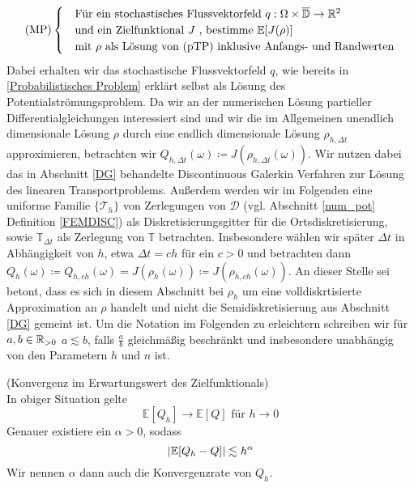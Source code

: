 \begin{align}
\text{(MP)}
\begin{cases}
\label{Modellproblem}
&\text{Für ein stochastisches Flussvektorfeld } q: \Omega \times \overline{\mathbb{D}} \to \mathbb{R}^2 \\
&\text{und ein Zielfunktional } J \text{ , bestimme }  \mathbb{E}[J(\rho)]  \\
&\text{mit } \rho \text{ als Lösung von (pTP) inklusive Anfangs- und Randwerten}
\end{cases}
\end{align} 
Dabei erhalten wir das stochastische Flussvektorfeld $ q $, wie bereits in \ref{Probabilistisches Problem} erklärt selbst als Lösung des Potentialströmungsproblem.
Da wir an der numerischen Lösung partieller Differentialgleichungen interessiert sind und wir die im Allgemeinen unendlich dimensionale Lösung $ \rho $ durch eine endlich dimensionale Lösung $ \rho_{h,\Delta t} $ approximieren, betrachten wir $ Q_{h,\Delta t}(\omega) \coloneqq J(\rho_{h,\Delta t}(\omega )) $.
Wir nutzen dabei das in Abschnitt \ref{DG} behandelte Discontinuous Galerkin Verfahren zur Lösung des linearen Transportproblems. Außerdem werden wir im Folgenden eine uniforme Familie $ \{ \mathcal{T}_h \} $ von Zerlegungen von $ \mathcal{D} $ (vgl. Abschnitt \ref{num_pot} Definition \ref{FEMDISC}) als Diskretisierungsgitter für die Ortsdiskretisierung, sowie $ \mathbb{T}_{\Delta t} $ als Zerlegung von $ \mathbb{T} $ betrachten.
Insbesondere wählen wir später $ \Delta t $ in Abhängigkeit von $ h $, etwa $ \Delta t = c  h $ für ein $ c>0 $ und betrachten dann
$ Q_h(\omega) \coloneqq Q_{h,ch}(\omega) = J(\rho_h(\omega )) \coloneqq J(\rho_{h,ch}(\omega )) $.
An dieser Stelle sei betont, dass es sich in diesem Abschnitt bei $ \rho_h $ um eine volldiskrtisierte Approximation an $ \rho $ handelt und nicht die Semidiskretisierung aus Abschnitt \ref{DG} gemeint ist. Um die Notation im Folgenden zu erleichtern schreiben wir für $ a,b \in \mathbb{R}_{> 0} $ $ a \lesssim b $, falls $\frac{a}{b}$ gleichmäßig beschränkt und insbesondere unabhängig von den Parametern $ h $ und $ n $ ist.
\begin{Annahme}(Konvergenz im Erwartungswert des Zielfunktionals)\\
	\label{Annahme1}
	In obiger Situation gelte 
	\[ 
	\mathbb{E}[Q_h] \to \mathbb{E}[Q] \text{ für } h \to 0   
	\]
	Genauer existiere ein $ \alpha > 0 $, sodass
	\[
		| \mathbb{E}[Q_h-Q] | \lesssim h^{\alpha}
	\]
	Wir nennen $ \alpha $ dann auch die Konvergenzrate von $ Q_h $.
\end{Annahme}


